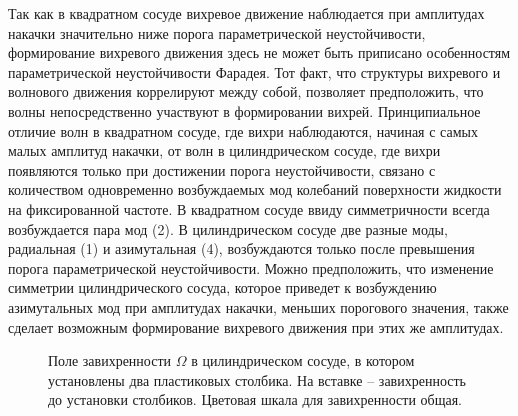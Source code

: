 Так как в квадратном сосуде вихревое движение наблюдается при амплитудах накачки значительно ниже порога параметрической неустойчивости, формирование вихревого движения здесь не может быть приписано особенностям параметрической неустойчивости Фарадея. Тот факт, что структуры вихревого и волнового движения коррелируют между собой, позволяет предположить, что волны непосредственно участвуют в формировании вихрей. Принципиальное отличие волн в квадратном сосуде, где вихри наблюдаются, начиная с самых малых амплитуд накачки, от волн в цилиндрическом сосуде, где вихри появляются только при достижении порога неустойчивости, связано с количеством одновременно возбуждаемых мод колебаний поверхности жидкости на фиксированной частоте. В квадратном сосуде ввиду симметричности всегда возбуждается пара мод (2). В цилиндрическом сосуде две разные моды, радиальная (1) и азимутальная (4), возбуждаются только после превышения порога параметрической неустойчивости. Можно предположить, что изменение симметрии цилиндрического сосуда, которое приведет к возбуждению азимутальных мод при амплитудах накачки, меньших порогового значения, также сделает возможным формирование вихревого движения при этих же амплитудах.

\begin{figure}[ht]
  \begin{minipage}[ht]{0.49\linewidth}
  \end{minipage}
  \hfill
  \begin{minipage}[ht]{0.49\linewidth}
  \end{minipage}
  \caption{Поле завихренности $\Omega$ в цилиндрическом сосуде, в котором установлены два пластиковых столбика. На вставке – завихренность до установки столбиков. Цветовая шкала для завихренности общая.}
  \label{img:vort_st}  
\end{figure}

